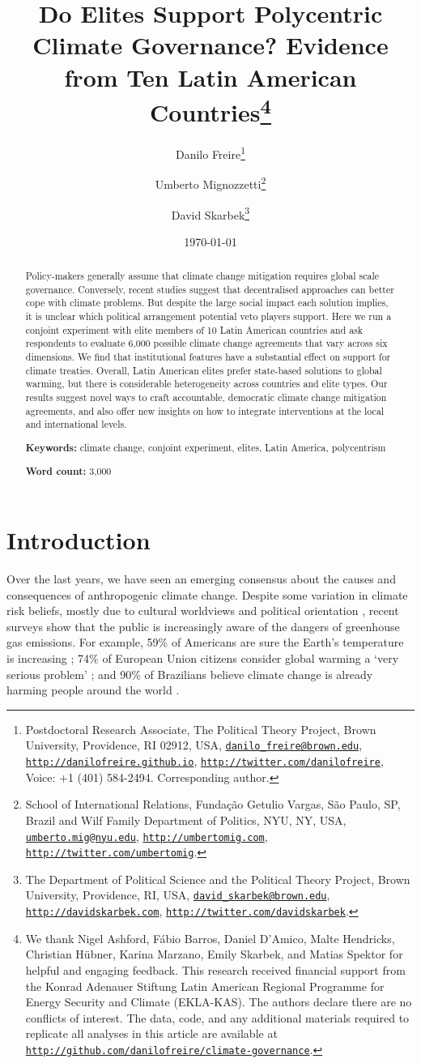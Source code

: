 \documentclass[a4paper,12pt]{article}
\title{Do Elites Support Polycentric Climate Governance? Evidence from Ten Latin American Countries\thanks{We thank Nigel Ashford, F\'{a}bio Barros, Daniel D'Amico, Malte Hendricks, Christian H\"{u}bner, Karina Marzano, Emily Skarbek, and Matias Spektor for helpful and engaging feedback. This research received financial support from the Konrad Adenauer Stiftung Latin American Regional Programme for Energy Security and Climate (EKLA-KAS). The authors declare there are no conflicts of interest. The data, code, and any additional materials required to replicate all analyses in this article are available at \href{http://github.com/danilofreire/climate-governance}{\texttt{http://github.com/danilofreire/climate-governance}}.}}
\author{Danilo Freire\thanks{Postdoctoral Research Associate, The Political Theory Project, Brown University, Providence, RI 02912, USA, \href{mailto:danilo_freire@brown.edu}{\texttt{danilo\_freire@brown.edu}}, \href{http://danilofreire.github.io}{\texttt{http://danilofreire.github.io}}, \href{http://twitter.com/danilofreire}{\texttt{http://twitter.com/danilofreire}}, Voice: +1 (401) 584-2494. Corresponding author.} 
\and Umberto Mignozzetti\thanks{School of International Relations, Funda\c{c}\~{a}o Getulio Vargas, S\~{a}o Paulo, SP, Brazil and Wilf Family Department of Politics, NYU, NY, USA, \href{mailto:umberto.mig@nyu.edu}{\texttt{umberto.mig@nyu.edu}}, \href{http://umbertomig.com}{\texttt{http://umbertomig.com}}, \href{http://twitter.com/umbertomig}{\texttt{http://twitter.com/umbertomig}}.} \and David Skarbek\thanks{The Department of Political Science and the Political Theory Project, Brown University, Providence, RI, USA, \href{mailto:david_skarbek@brown.edu}{\texttt{david\_skarbek@brown.edu}}, \href{http://davidskarbek.com}{\texttt{http://davidskarbek.com}}, \href{http://twitter.com/davidskarbek}{\texttt{http://twitter.com/davidskarbek}}.}
}
\date{\today}
\begin{document}
\maketitle

\begin{abstract}
\onehalfspacing
\noindent
Policy-makers generally assume that climate change mitigation requires global scale governance. Conversely, recent studies suggest that decentralised approaches can better cope with climate problems. But despite the large social impact each solution implies, it is unclear which political arrangement potential veto players support. Here we run a conjoint experiment with elite members of 10 Latin American countries and ask respondents to evaluate 6,000 possible climate change agreements that vary across six dimensions. We find that institutional features have a substantial effect on support for climate treaties. Overall, Latin American elites prefer state-based solutions to global warming, but there is considerable heterogeneity across countries and elite types. Our results suggest novel ways to craft accountable, democratic climate change mitigation agreements, and also offer new insights on how to integrate interventions at the local and international levels.

\vspace{.5cm}

\noindent 
\textbf{Keywords:} climate change, conjoint experiment, elites, Latin America, polycentrism

\vspace{.5cm}

\noindent 
\textbf{Word count:} 3,000
\end{abstract}

\newpage

\doublespacing

\section{Introduction}%
\label{sec:introduction}

Over the last years, we have seen an emerging consensus about the causes and consequences of anthropogenic climate change. Despite some variation in climate risk beliefs, mostly due to cultural worldviews and political orientation \citep{hornsey2016meta}, recent surveys show that the public is increasingly aware of the dangers of greenhouse gas emissions. For example, 59\% of Americans are sure the Earth's temperature is increasing \citep{stanfordearth2018}; 74\% of European Union citizens consider global warming a `very serious problem' \citep{europe2018survey}; and 90\% of Brazilians believe climate change is already harming people around the world \citep{pew2018climate}.
\end{document}
